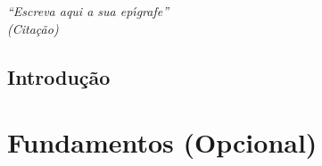 %
\begin{epigrafe}
    \vspace*{\fill}
	\begin{flushright}
		\textit{``Escreva aqui a sua ep\'{\i}grafe''\\
		(Cita\c{c}\~{a}o)}
	\end{flushright}
\end{epigrafe}
%
%
\listoffigures*
\cleardoublepage
%
\listoftables*
\cleardoublepage
%

\tableofcontents*
\clearpage

\setcounter{page}{14}

\textual


\chapter{Introdu\c{c}\~{a}o}
\label{cap:intro}
\lipsum[1-4]    %

\part{Fundamentos (Opcional)}





%

%



\postextual




\begin{apendicesenv}



\end{apendicesenv}


%
%
%
%
%

 